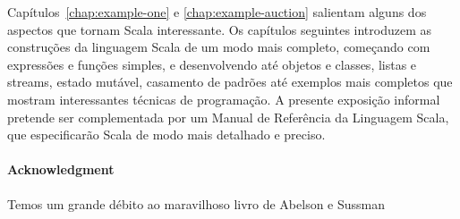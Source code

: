\documentclass[a4paper,12pt,twoside,titlepage]{book}
\begin{document}
Capítulos~\ref{chap:example-one} e \ref{chap:example-auction}
salientam alguns dos aspectos que tornam Scala interessante. Os
capítulos seguintes introduzem as construções da linguagem Scala de um
modo mais completo, começando com expressões e funções simples, e 
desenvolvendo até objetos e classes, listas e streams, estado 
mutável, casamento de padrões até exemplos mais completos que mostram
interessantes técnicas de programação. A presente exposição informal
pretende ser complementada por um Manual de Referência da Linguagem Scala, que
especificarão Scala de modo mais detalhado e preciso. 


\paragraph{Acknowledgment}
Temos um grande débito ao maravilhoso livro de Abelson e Sussman






\end{document}
